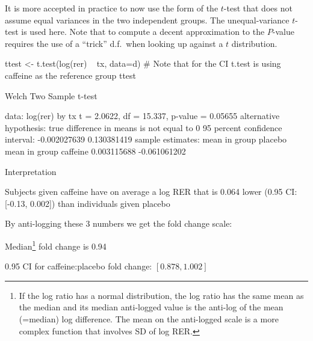 It is more accepted in practice to now use the form of the $t$-test
that does not assume equal variances in the two independent groups.
The unequal-variance $t$-test is used here.  Note that to compute a
decent approximation to the $P$-value requires the use of a ``trick''
d.f.\ when looking up against a $t$ distribution.
\begin{Schunk}
\begin{Sinput}
ttest <- t.test(log(rer) ~ tx, data=d)
# Note that for the CI t.test is using caffeine as the reference group
ttest
\end{Sinput}
\begin{Soutput}

	Welch Two Sample t-test

data:  log(rer) by tx
t = 2.0622, df = 15.337, p-value = 0.05655
alternative hypothesis: true difference in means is not equal to 0
95 percent confidence interval:
 -0.002027639  0.130381419
sample estimates:
 mean in group placebo mean in group caffeine 
           0.003115688           -0.061061202 
\end{Soutput}
\end{Schunk}
\bi
\item Interpretation
 \bi
 \item Subjects given caffeine have on average a log RER that is 0.064
   lower (0.95 CI: [-0.13, 0.002]) than individuals given placebo
 \item By anti-logging these 3 numbers we get the fold change scale:
   \bi
   \item Median\footnote{If the log ratio has a normal distribution,
       the log ratio has the same mean as the median and its
       median anti-logged value is the anti-log of the mean (=median)
       log difference.  The mean on the anti-logged scale is a more
       complex function that involves SD of log RER.} fold change is 0.94
   \item 0.95 CI for caffeine:placebo fold change: $[0.878, 1.002]$
   \ei
 \ei
\ei

